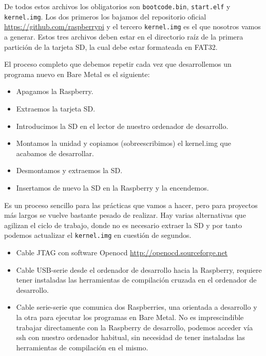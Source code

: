 De todos estos archivos los obligatorios son {\tt bootcode.bin}, {\tt start.elf} y
{\tt kernel.img}. Los dos primeros los bajamos del repositorio oficial
\textcolor{blue}{
  \href{https://github.com/raspberrypi}
  {https://github.com/raspberrypi}}
y el tercero {\tt kernel.img} es el que nosotros
vamos a generar. Estos tres archivos deben estar en el directorio raíz de la primera partición
de la tarjeta SD, la cual debe estar formateada en FAT32.

El proceso completo que debemos repetir cada vez que desarrollemos un programa nuevo
en Bare Metal es el siguiente:

\begin{itemize}
  \item Apagamos la Raspberry.
  \item Extraemos la tarjeta SD.
  \item Introducimos la SD en el lector de nuestro ordenador de desarrollo.
  \item Montamos la unidad y copiamos (sobreescribimos) el kernel.img que acabamos
        de desarrollar.
  \item Desmontamos y extraemos la SD.
  \item Insertamos de nuevo la SD en la Raspberry y la encendemos.
\end{itemize}

Es un proceso sencillo para las prácticas que vamos a hacer, pero para proyectos más largos
se vuelve bastante pesado de realizar. Hay varias alternativas que agilizan el ciclo de
trabajo, donde no es necesario extraer la SD y por tanto podemos actualizar el {\tt kernel.img}
en cuestión de segundos.

\begin{itemize}
  \item Cable JTAG con software Openocd
\textcolor{blue}{
  \href{http://openocd.sourceforge.net}
  {http://openocd.sourceforge.net}}
  \item Cable USB-serie desde el ordenador de desarrollo hacia la Raspberry, requiere
        tener instaladas las herramientas de compilación cruzada en el ordenador de desarrollo.
  \item Cable serie-serie que comunica dos Raspberries, una orientada a desarrollo y la otra
        para ejecutar los programas en Bare Metal. No es imprescindible trabajar directamente
        con la Raspberry de desarrollo, podemos acceder vía ssh con nuestro ordenador habitual,
        sin necesidad de tener instaladas las herramientas de compilación en el mismo.
\end{itemize}

